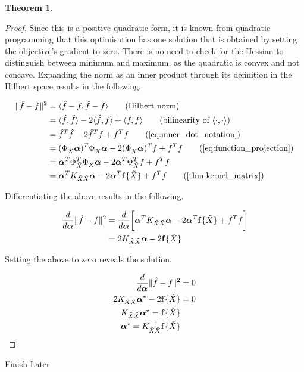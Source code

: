\documentclass[twoside]{article} \usepackage{aistats2017}
\theoremstyle{definition}
\newtheorem{theorem}{Theorem}[section]
\newcommand{\ds}[1]{\tilde{#1}}
\newcommand{\warn}[1]{{\color{red} #1}}
\newcommand{\inner}[2]{{\langle #1, #2 \rangle}}
\begin{document}
\begin{theorem}
\begin{proof}
			Since this is a positive quadratic form, it is known from quadratic programming that this optimisation has one solution that is obtained by setting the objective's gradient to zero. There is no need to check for the Hessian to distinguish between minimum and maximum, as the quadratic is convex and not concave. Expanding the norm as an inner product through its definition in the Hilbert space results in the following.

			\begin{align*}
				\Vert \hat{f} - f \Vert^{2} &= \langle \hat{f} - f, \hat{f} - f \rangle \tag{Hilbert norm} \\
				&= \langle \hat{f}, \hat{f} \rangle - 2 \langle \hat{f}, f \rangle + \langle f, f \rangle \tag{bilinearity of $\inner{\cdot}{\cdot}$} \\
				&=  \hat{f}^{T} \hat{f} - 2 \hat{f}^{T} f + f^{T} f \tag{\cref{eq:inner_dot_notation}} \\
				&= (\Phi_{\ds{X}} \bm{\alpha})^{T} \Phi_{\ds{X}}  \bm{\alpha} - 2 (\Phi_{\ds{X}}  \bm{\alpha})^{T} f + f^{T} f \tag{\cref{eq:function_projection}}\\
				&= \bm{\alpha}^{T} \Phi_{\ds{X}} ^{T} \Phi_{\ds{X}}  \bm{\alpha} - 2 \bm{\alpha}^{T} \Phi_{\ds{X}} ^{T} f + f^{T} f \\
				&= \bm{\alpha}^{T} K_{\ds{X} \ds{X}}  \bm{\alpha} - 2 \bm{\alpha}^{T} \bvec{f}\{\ds{X}\} + f^{T} f \tag{\cref{thm:kernel_matrix}}\\
			\end{align*}
			
			Differentiating the above results in the following.
			
			\begin{align*}
				\frac{d}{d \bm{\alpha}} \Vert \hat{f} - f \Vert^{2} &= \frac{d}{d \bm{\alpha}} 
				\bigg[ \bm{\alpha}^{T} K_{\ds{X} \ds{X}}  \bm{\alpha} - 2 \bm{\alpha}^{T} \bvec{f}\{\ds{X}\} + f^{T} f \bigg]\\
				&= 2 K_{\ds{X} \ds{X}}  \bm{\alpha} - 2 \bvec{f}\{\ds{X}\}
			\end{align*}
			
			Setting the above to zero reveals the solution.
			
			\begin{align*}
				\frac{d}{d \bm{\alpha}} \Vert \hat{f} - f \Vert^{2} &= 0 \\
				2 K_{\ds{X} \ds{X}}  \bm{\alpha}^{\star} - 2 \bvec{f}\{\ds{X}\} &= 0 \\
				K_{\ds{X} \ds{X}}  \bm{\alpha}^{\star} = \bvec{f}\{\ds{X}\} \\
				\bm{\alpha}^{\star} = K_{\ds{X} \ds{X}}^{-1} \bvec{f}\{\ds{X}\}
			\end{align*}			
		\end{proof}
	\end{theorem}
		\warn{Finish Later.}
\end{document}
